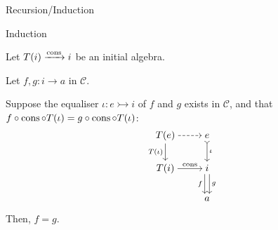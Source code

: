 \begin{frame}{Recursion/Induction} %
  
  \begin{block}{Induction}
    
    \par Let $T(i) \xrightarrow{\operatorname{cons}} i$ be an initial algebra.
    \par Let $f, g : i \to a$ in $\mathcal{C}$.
    \par Suppose the equaliser $\iota : e \rightarrowtail i$ of $f$ and $g$ exists in $\mathcal{C}$, and that $f \circ \operatorname{cons} \circ T(\iota) = g \circ \operatorname{cons} \circ T(\iota)$:
    \vspace{-0.5 \baselineskip}
    \begin{align*}
      \begin{tikzcd}[cramped, ampersand replacement = \;]
          T(e)
            \arrow[r, dashed]
            \arrow[d, "T(\iota)"']
          \;
          e
            \arrow[d, "\iota", tail]
        \\
          T(i)
            \arrow[r, "\cons"]
          \;
          i
            \arrow[d, "f"', shift right]
            \arrow[d, "g", shift left]
        \\
          \;
          a
      \end{tikzcd}
    \end{align*}
    \par Then, $f = g$.

  \end{block}

\end{frame}

